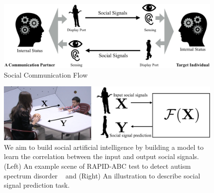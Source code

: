 %
\begin{figure}[t]
	\includegraphics[width=\linewidth]{ssp_fig/socialcomm}
	\caption{Social Communication Flow}
\label{fig:ssp_intro}
\end{figure}
\begin{figure}[t]
	\centering
	\includegraphics[width=\linewidth]{ssp_fig/intro}
	\caption{We aim to build social artificial intelligence by building a model to learn the correlation between the input and output social signals. (Left) An example scene of RAPID-ABC test to detect autism spectrum disorder ~\cite{mathys2013beyond} and (Right) An illustration to describe social signal prediction task.}
	\label{fig:ssp_intro}
\end{figure}

